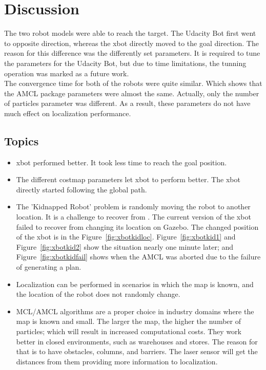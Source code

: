 \documentclass[10pt,journal,compsoc]{IEEEtran}
\begin{document}
\section{Discussion}
The two robot models were able to reach the target. The Udacity Bot first went to opposite direction, whereas the xbot directly moved to the goal direction. The reason for this difference was the differently set parameters. It is required to tune the parameters for the Udacity Bot, but due to time limitations, the tunning operation was marked as a future work. \\
The convergence time for both of the robots were quite similar. Which shows that the AMCL package parameters were almost the same. Actually, only the number of particles parameter was different. As a result, these parameters do not have much effect on localization performance.

\subsection{Topics}
\begin{itemize}
\item xbot performed better. It took less time to reach the goal position.
\item The different costmap parameters let xbot to perform better. The xbot directly started following the global path.
\item The 'Kidnapped Robot' problem is randomly moving the robot to another location. It is a challenge to recover from \cite{wiki:krp}. The current version of the xbot failed to recover from changing its location on Gazebo. The changed position of the xbot is in the Figure~\ref{fig:xbotkidloc}. Figure~\ref{fig:xbotkid1} and Figure~\ref{fig:xbotkid2} show the situation nearly one minute later; and Figure~\ref{fig:xbotkidfail} shows when the AMCL was aborted due to the failure of generating a plan.
\item Localization can be performed in scenarios in which the map is known, and the location of the robot does not randomly change.
\item MCL/AMCL algorithms are a proper choice in industry domains where the map is known and small. The larger the map, the higher the number of particles; which will result in increased computational costs. They work better in closed environments, such as warehouses and stores. The reason for that is to have obstacles, columns, and barriers. The laser sensor will get the distances from them providing more information to localization.
\end {itemize}
\end{document}

